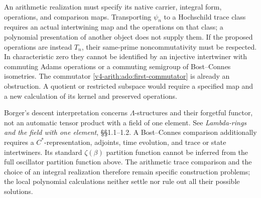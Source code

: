 \begin{question}
\label{v4-arith:thm:bost-connes-descent}
An arithmetic realization must specify its native carrier, integral
form, operations, and comparison maps. Transporting \(\psi_n\) to a
Hochschild trace class requires an actual intertwining map and the
operations on that class; a polynomial presentation of another object
does not supply them. If the proposed operations are instead \(T_n\),
their same-prime noncommutativity must be respected. In characteristic
zero they cannot be identified by an injective intertwiner with commuting
Adams operations or a commuting semigroup of Bost--Connes isometries.
The commutator \eqref{v4-arith:ado:first-commutator} is already an
obstruction. A quotient or restricted subspace would require a specified
map and a new calculation of its kernel and preserved operations.
\end{question}


\begin{remark}
\label{v4-arith:rem:three-level-structure}
Borger's descent interpretation concerns \(\Lambda\)-structures and their
forgetful functor, not an automatic tensor product with a field of one
element. See \emph{Lambda-rings and the field with one element},
\S\S1.1--1.2. A Bost--Connes comparison additionally requires a
\(C^*\)-representation, adjoints, time evolution, and trace or state
intertwiners. Its standard \(\zeta(\beta)\) partition function cannot be
inferred from the full oscillator partition function above. The arithmetic
trace comparison and the choice of an integral realization therefore
remain specific construction problems; the local polynomial calculations
neither settle nor rule out all their possible solutions.
\end{remark}
